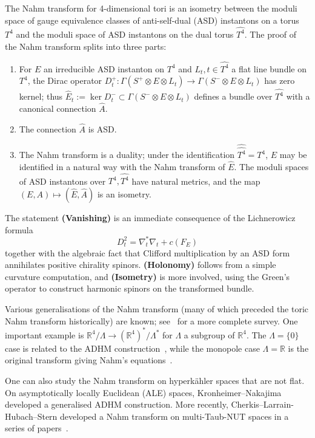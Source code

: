 \documentclass{article}
\newcommand{\wh}{\widehat}
\newcommand{\real}{\mathbb{R}}
\theoremstyle{definition}
\theoremstyle{remark}
\begin{document}
The Nahm transform for 4-dimensional tori is an isometry between the moduli space of gauge equivalence classes of anti-self-dual (ASD) instantons on a torus $T^4$ and the moduli space of ASD instantons on the dual torus $\wh{T^4}$.
The proof of the Nahm transform splits into three parts:
\begin{enumerate}[widest={\textbf{(Holonomy)}}]
    \item[\textbf{(Vanishing)}] For $E$ an irreducible ASD instanton on $T^4$ and $L_t, t \in \wh{T^4}$ a flat line bundle on $T^4$, the Dirac operator $D^+_t \colon \Gamma(S^+ \otimes E \otimes L_t) \to \Gamma(S^- \otimes E \otimes L_t)$ has zero kernel; thus $\wh{E}_t := \ker D^-_t \subset \Gamma(S^- \otimes E \otimes L_t)$ defines a bundle over $\wh{T^4}$ with a canonical connection $\wh{A}$.
    \item[\textbf{(Holonomy)}] The connection $\wh{A}$ is ASD.
    \item[\textbf{(Isometry)}] The Nahm transform is a duality; under the identification $\wh{\wh{T^4}} = T^4$, $E$ may be identified in a natural way with the Nahm transform of $\wh{E}$.
        The moduli spaces of ASD instantons over $T^4, \wh{T^4}$ have natural metrics, and the map $(E, A) \mapsto (\wh{E}, \wh{A})$ is an isometry.
\end{enumerate}
The statement \textbf{(Vanishing)} is an immediate consequence of the Lichnerowicz formula
\begin{equation}
    \label{eq:lichnerowicz}
    D_t^2  = \nabla_t^* \nabla_t + c(F_E)
\end{equation}
together with the algebraic fact that Clifford multiplication by an ASD form annihilates positive chirality spinors.
\textbf{(Holonomy)} follows from a simple curvature computation, and \textbf{(Isometry)} is more involved, using the Green's operator to construct harmonic spinors on the transformed bundle.

Various generalisations of the Nahm transform (many of which preceded the toric Nahm transform historically) are known; see~\cite{jardimSurveyNahmTransform2004} for a more complete survey. 
One important example is $\real^4/\Lambda \to (\real^4)^* / \Lambda^*$ for $\Lambda$ a subgroup of $\real^4$.
The $\Lambda = \{0\}$ case is related to the ADHM construction~\cite{atiyahConstructionInstantons1978}, while the monopole case $\Lambda = \real$ is the original transform giving Nahm's equations~\cite{nahmAllSelfdualMultimonopoles1983}.

One can also study the Nahm transform on hyperk\"ahler spaces that are not flat.
On asymptotically locally Euclidean (ALE) spaces, Kronheimer--Nakajima~\cite{kronheimerYangMillsInstantonsALE1990} developed a generalised ADHM construction. 
More recently, Cherkis--Larrain-Hubach--Stern developed a Nahm transform on multi-Taub-NUT spaces in a series of papers~\cite{cherkisInstantonsMultiTaubNUTSpaces2021,cherkisInstantonsMultiTaubNUTSpaces2021a,cherkisInstantonsMultiTaubNUTSpaces2025}.
\end{document}
